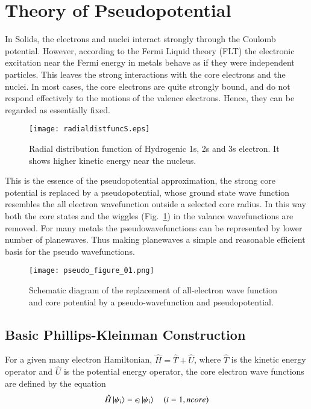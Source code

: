 \section{Theory of Pseudopotential}
In Solids, the electrons and nuclei interact strongly through the Coulomb potential. However, according to the Fermi Liquid theory (FLT) the electronic excitation near the Fermi energy in metals behave as if they were independent particles. This leaves the strong interactions with the core electrons and the nuclei. In most cases, the core electrons are quite strongly bound, and do not respond effectively to the motions of the valence electrons. Hence, they can be regarded as essentially fixed.
\begin{figure}
\centering
\texttt{[image: radialdistfuncS.eps]}
\caption{Radial distribution function of Hydrogenic 1s, 2s and 3s electron. It shows higher kinetic energy near the nucleus.}
\label{fig_hydrogen}
\end{figure}
This is the essence of the pseudopotential approximation, the strong core potential is replaced by a pseudopotential, whose ground state wave function resembles the all electron wavefunction outside a selected core radius. In this way both the core states and the wiggles (Fig.~\ref{fig_hydrogen}) in the valance wavefunctions are removed. For many metals the pseudowavefunctions can be represented by lower number of planewaves. Thus making planewaves a simple and reasonable efficient basis for the pseudo wavefunctions.
\begin{figure}
\centering
\texttt{[image: pseudo\_figure\_01.png]}
\caption{Schematic diagram of the replacement of all-electron wave function and core potential by a pseudo-wavefunction and pseudopotential.}
\end{figure}
\subsection{Basic Phillips-Kleinman Construction}
For a given many electron Hamiltonian, $\hat{H}=\hat{T}+\hat{U}$, where $\hat{T}$ is the kinetic energy operator and $\hat{U}$ is the potential energy operator, the core electron wave functions are defined by the \schrod equation
\begin{equation}
 \hat{H}\ket{\psi_i} = \epsilon_i \ket{\psi_i} \quad   (i = 1, n core)
\end{equation}

